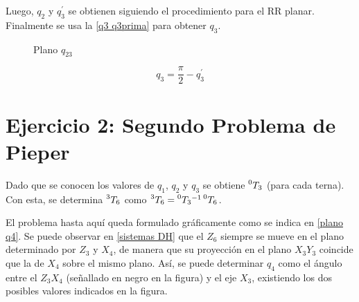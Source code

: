 \documentclass[a4paper,12pt]{article}
\begin{document}
Luego, $q_2$ y $q_3^{\prime}$ se obtienen siguiendo el procedimiento para el RR planar. Finalmente se usa la \cref{q3 q3prima} para obtener $q_3$.

\begin{figure}[H]
    \centering
    \begin{adjustbox}{max width=\columnwidth}
    \end{adjustbox}
    \caption{Plano $q_{23}$}
    \label{q23}
\end{figure}

\begin{equation}
    q_3= \frac{\pi}{2} - q_3^{\prime}
    \label{q3 q3prima}
\end{equation}

\section{Ejercicio 2: Segundo Problema de Pieper}
Dado que se conocen los valores de $q_1$, $q_2$ y $q_3$ se obtiene 
$\prescript{0}{}{T_3}$ (para cada terna). Con esta, se determina $\prescript{3}{}{T_6}$ 
como $\prescript{3}{}{T_6} = \prescript{0}{}{T_3}^{-1}\prescript{0}{}{T_6}$.

El problema hasta aquí queda formulado gráficamente como se indica en \cref{plano q4}.
Se puede observar en \cref{sistemas DH} que el $Z_6$ siempre se mueve en el plano determinado por
$Z_3$ y $X_4$, de manera que su proyección en el plano $X_3Y_3$ coincide que la de $X_4$ sobre el mismo plano.
Así, se puede determinar $q_4$ como el ángulo entre el $Z_3X_4$ (señallado en negro en la figura) y el eje $X_3$, existiendo
los dos posibles valores indicados en la figura.
\end{document}
